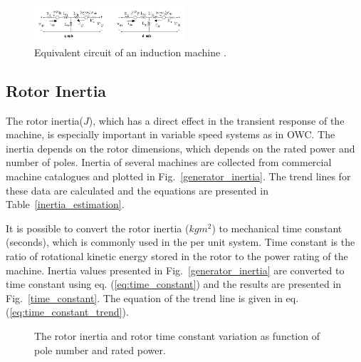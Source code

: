 \documentclass[twocolumn]{article}
\begin{document}
  \begin{figure}
    \centering
    \includegraphics[width=0.5\textwidth]{scig_schematic}
    \caption{Equivalent circuit of an induction machine \cite{matlab2014}.} 
    \label{equivalent_circuit}
  \end{figure}
  
\subsection*{Rotor Inertia}

The rotor inertia($J$), which has a direct effect in the transient response of the machine, is especially important in variable speed systems as in OWC. The inertia depends on the rotor dimensions, which depends on the rated power and number of poles. Inertia of several machines are collected from commercial machine catalogues \cite{Siemens2012,ABB2010} and plotted in Fig.~\ref{generator_inertia}. The trend lines for these data are calculated and the equations are presented in Table~\ref{inertia_estimation}.

It is possible to convert the rotor inertia ($kgm^2$) to mechanical time constant (seconds), which is commonly used in the per unit system.  Time constant is the ratio of rotational kinetic energy stored in the rotor to the power rating of the machine. Inertia values presented in Fig.~\ref{generator_inertia} are converted to time constant using eq. (\ref{eq:time_constant}) and the results are presented in Fig.~\ref{time_constant}. The equation of the trend line is given in eq. (\ref{eq:time_constant_trend}).


\begin{figure}[]
  \centering

    \caption{The rotor inertia and rotor time constant variation as function of pole number and rated power.} 
    \label{inertia_timeconstant}
\end{figure}
\end{document}
